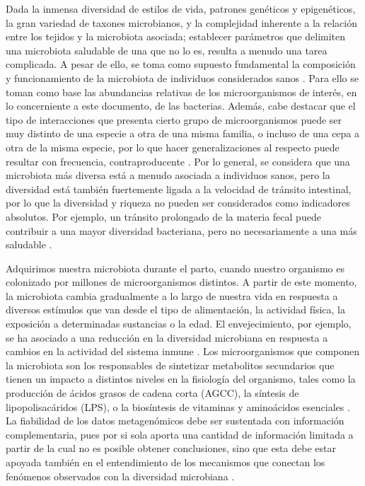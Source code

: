 \documentclass[
]{book}
\begin{document}
Dada la inmensa diversidad de estilos de vida, patrones genéticos y epigenéticos, la gran variedad de taxones microbianos, y la complejidad inherente a la relación entre los tejidos y la microbiota asociada; establecer parámetros que delimiten una microbiota saludable de una que no lo es, resulta a menudo una tarea complicada. A pesar de ello, se toma como supuesto fundamental la composición y funcionamiento de la microbiota de individuos considerados sanos \citep{korem2015growth}. Para ello se toman como base las abundancias relativas de los microorganismos de interés, en lo concerniente a este documento, de las bacterias. Además, cabe destacar que el tipo de interacciones que presenta cierto grupo de microorganismos puede ser muy distinto de una especie a otra de una misma familia, o incluso de una cepa a otra de la misma especie, por lo que hacer generalizaciones al respecto puede resultar con frecuencia, contraproducente \citep{falony2018richness}. Por lo general, se considera que una microbiota más diversa está a menudo asociada a individuos sanos, pero la diversidad está también fuertemente ligada a la velocidad de tránsito intestinal, por lo que la diversidad y riqueza no pueden ser considerados como indicadores absolutos. Por ejemplo, un tránsito prolongado de la materia fecal puede contribuir a una mayor diversidad bacteriana, pero no necesariamente a una más saludable \citep{korem2015growth}.

Adquirimos nuestra microbiota durante el parto, cuando nuestro organismo es colonizado por millones de microorganismos distintos. A partir de este momento, la microbiota cambia gradualmente a lo largo de nuestra vida en respuesta a diversos estímulos que van desde el tipo de alimentación, la actividad física, la exposición a determinadas sustancias o la edad. El envejecimiento, por ejemplo, se ha asociado a una reducción en la diversidad microbiana en respuesta a cambios en la actividad del sistema inmune \citep{yatsunenko2012human}. Los microorganismos que componen la microbiota son los responsables de sintetizar metabolitos secundarios que tienen un impacto a distintos niveles en la fisiología del organismo, tales como la producción de ácidos grasos de cadena corta (AGCC), la síntesis de lipopolisacáridos (LPS), o la biosíntesis de vitaminas y aminoácidos esenciales \citep{qin2010human}. La fiabilidad de los datos metagenómicos debe ser sustentada con información complementaria, pues por si sola aporta una cantidad de información limitada a partir de la cual no es posible obtener conclusiones, sino que esta debe estar apoyada también en el entendimiento de los mecanismos que conectan los fenómenos observados con la diversidad microbiana \citep{backhed2004gut}.
\end{document}
